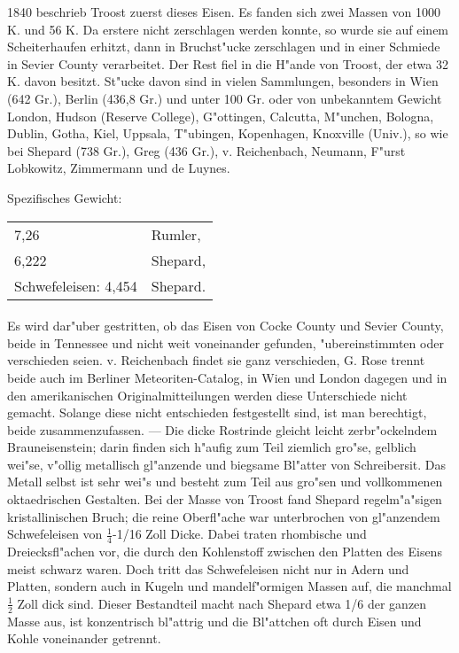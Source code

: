 \documentclass[a4paper, 11pt, oneside]{article}
\begin{document}
1840 beschrieb Troost zuerst dieses Eisen. Es fanden sich zwei Massen von 1000 K. und 56 K. Da erstere nicht zerschlagen werden konnte, so wurde sie auf einem Scheiterhaufen erhitzt, dann in Bruchst"ucke zerschlagen und in einer Schmiede in Sevier County verarbeitet. Der Rest fiel in die H"ande von Troost, der etwa 32 K. davon besitzt. St"ucke davon sind in vielen Sammlungen, besonders in Wien (642 Gr.), Berlin (436,8 Gr.) und unter 100 Gr. oder von unbekanntem Gewicht London, Hudson (Reserve College), G"ottingen, Calcutta, M"unchen, Bologna, Dublin, Gotha, Kiel, Uppsala, T"ubingen, Kopenhagen, Knoxville (Univ.), so wie bei Shepard (738 Gr.), Greg (436 Gr.), v. Reichenbach, Neumann, F"urst Lobkowitz, Zimmermann und de Luynes.

Spezifisches Gewicht:  
\begin{table}[!ht]
    \centering
    \begin{tabular}{l l}
        7,26 & Rumler,\\
        6,222 & Shepard,\\
        Schwefeleisen: 4,454 & Shepard.
    \end{tabular}
\end{table}
\paragraph{}
Es wird dar"uber gestritten, ob das Eisen von Cocke County und Sevier County, beide in Tennessee und nicht weit voneinander gefunden, "ubereinstimmten oder verschieden seien. v. Reichenbach findet sie ganz verschieden, G. Rose trennt beide auch im Berliner Meteoriten-Catalog, in Wien und London dagegen und in den amerikanischen Originalmitteilungen werden diese Unterschiede nicht gemacht. Solange diese nicht entschieden festgestellt sind, ist man berechtigt, beide zusammenzufassen. --- Die dicke Rostrinde gleicht leicht zerbr"ockelndem Brauneisenstein; darin finden sich h"aufig zum Teil ziemlich gro"se, gelblich wei"se, v"ollig metallisch gl"anzende und biegsame Bl"atter von Schreibersit. Das Metall selbst ist sehr wei"s und besteht zum Teil aus gro"sen und vollkommenen oktaedrischen Gestalten. Bei der Masse von Troost fand Shepard regelm"a"sigen kristallinischen Bruch; die reine Oberfl"ache war unterbrochen von gl"anzendem Schwefeleisen von $\frac{1}{4}$-1/16 Zoll Dicke. Dabei traten rhombische und Dreiecksfl"achen vor, die durch den Kohlenstoff zwischen den Platten des Eisens meist schwarz waren. Doch tritt das Schwefeleisen nicht nur in Adern und Platten, sondern auch in Kugeln und mandelf"ormigen Massen auf, die manchmal $\frac{1}{2}$ Zoll dick sind. Dieser Bestandteil macht nach Shepard etwa 1/6 der ganzen Masse aus, ist konzentrisch bl"attrig und die Bl"attchen oft durch Eisen und Kohle voneinander getrennt.
\end{document}
